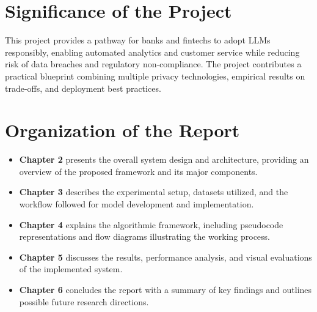 \documentclass[12pt,a4paper]{report}
\begin{document}
\section{Significance of the Project}
This project provides a pathway for banks and fintechs to adopt LLMs responsibly, 
enabling automated analytics and customer service while reducing risk of data breaches 
and regulatory non-compliance. The project contributes a practical blueprint combining 
multiple privacy technologies, empirical results on trade-offs, and deployment best practices.

\section{Organization of the Report}
\begin{itemize}
    \item \textbf{Chapter 2} presents the overall system design and architecture, providing an overview of the proposed framework and its major components.
    
    \item \textbf{Chapter 3} describes the experimental setup, datasets utilized, and the workflow followed for model development and implementation.
    
    \item \textbf{Chapter 4} explains the algorithmic framework, including pseudocode representations and flow diagrams illustrating the working process.
    
    \item \textbf{Chapter 5} discusses the results, performance analysis, and visual evaluations of the implemented system.
    
    \item \textbf{Chapter 6} concludes the report with a summary of key findings and outlines possible future research directions.
\end{itemize}

\end{document}
